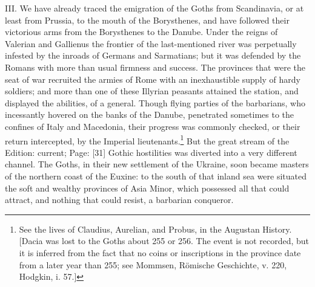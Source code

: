 III. We have already traced the emigration of the Goths from Scandinavia, or at least from Prussia, to the mouth of the Borysthenes, and have followed their victorious arms from the Borysthenes to the Danube. Under the reigns of Valerian and Gallienus the frontier of the last-mentioned river was perpetually infested by the inroads of Germans and Sarmatians; but it was defended by the Romans with more than usual firmness and success. The provinces that were the seat of war recruited the armies of Rome with an inexhaustible supply of hardy soldiers; and more than one of these Illyrian peasants attained the station, and displayed the abilities, of a general. Though flying parties of the barbarians, who incessantly hovered on the banks of the Danube, penetrated sometimes to the confines of Italy and Macedonia, their progress was commonly checked, or their return intercepted, by the Imperial lieutenants.\footnote{See the lives of Claudius, Aurelian, and Probus, in the Augustan History. [Dacia was lost to the Goths about 255 or 256. The event is not recorded, but it is inferred from the fact that no coins or inscriptions in the province date from a later year than 255; see Mommsen, Römische Geschichte, v. 220, Hodgkin, i. 57.]} But the great stream of the Edition: current; Page: [31] Gothic hostilities was diverted into a very different channel. The Goths, in their new settlement of the Ukraine, soon became masters of the northern coast of the Euxine: to the south of that inland sea were situated the soft and wealthy provinces of Asia Minor, which possessed all that could attract, and nothing that could resist, a barbarian conqueror.

